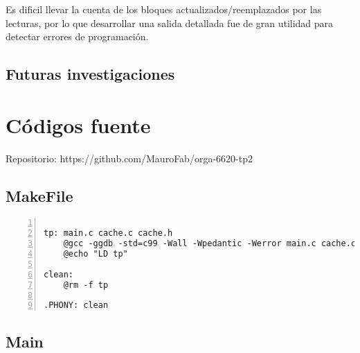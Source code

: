 \documentclass[11pt,a4paper, spanish]{article}
\begin{document}
Es dificil llevar la cuenta de los bloques actualizados/reemplazados por las lecturas, por lo que desarrollar
una salida detallada fue de gran utilidad para detectar errores de programación.


\subsection{Futuras investigaciones}



\newpage

\section{C\'odigos fuente}

Repositorio: https://github.com/MauroFab/orga-6620-tp2

\subsection{MakeFile}

\begin{lstlisting}[numbers=left, tabsize=2, basicstyle=\fontsize{11}{13}\ttfamily, frame=single, caption={makefile}]

tp: main.c cache.c cache.h
	@gcc -ggdb -std=c99 -Wall -Wpedantic -Werror main.c cache.c -o tp -lm
	@echo "LD tp"

clean:
	@rm -f tp

.PHONY: clean

\end{lstlisting}

\subsection{Main}
\end{document}
